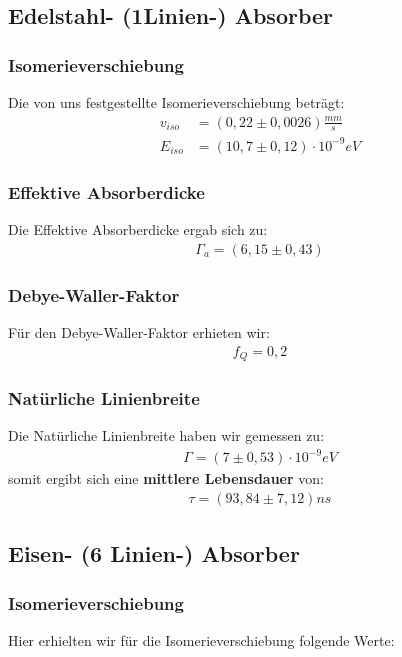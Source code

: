 \documentclass[12pt]{article}
\begin{document}
\subsection*{Edelstahl- (1Linien-) Absorber}
\subsubsection*{Isomerieverschiebung}
Die von uns festgestellte Isomerieverschiebung beträgt:
\begin{align*}
 v_{iso} &= ( 0,22 \pm 0,0026) \frac{mm}{s} \\
 E_{iso} &= ( 10,7 \pm 0,12 ) \cdot 10^{-9} eV
\end{align*}

\subsubsection*{Effektive Absorberdicke}
Die Effektive Absorberdicke ergab sich zu:
\begin{align*}
 \Gamma_a = ( 6,15 \pm 0,43 )
\end{align*}

\subsubsection*{Debye-Waller-Faktor}
Für den Debye-Waller-Faktor erhieten wir:
\begin{align*}
 f_Q = 0,2
\end{align*}

\subsubsection*{Natürliche Linienbreite}
Die Natürliche Linienbreite haben wir gemessen zu:
\begin{align*}
 \Gamma = ( 7 \pm 0,53) \cdot 10^{-9} eV
\end{align*}
somit ergibt sich eine \textbf{mittlere Lebensdauer} von:
\begin{align*}
 \tau = (93,84 \pm 7,12) ns
\end{align*}

\subsection*{Eisen- (6 Linien-) Absorber}
\subsubsection*{Isomerieverschiebung}
Hier erhielten wir für die Isomerieverschiebung folgende Werte: \\
\end{document}
